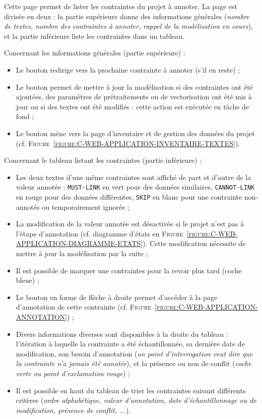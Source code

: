 		Cette page permet de lister les contraintes du projet à annoter.
		La page est divisée en deux : la partie supérieure donne des informations générales (\textit{nombre de textes, nombre des contraintes à annoter, rappel de la modélisation en cours}), et la partie inférieure liste les contraintes dans un tableau.
		
		Concernant les informations générales (partie supérieure) :
		\begin{itemize}
			\item Le bouton  redirige vers la prochaine contrainte à annoter (s'il en reste) ;
			\item Le bouton  permet de mettre à jour la modélisation si des contraintes ont été ajoutées, des paramètres de prétraitements ou de vectorisation ont été mis à jour ou si des textes ont été modifiés : cette action est exécutée en tâche de fond ;
			\item Le bouton  mène vers la page d'inventaire et de gestion des données du projet (cf. \textsc{Figure~\ref{figure:C-WEB-APPLICATION-INVENTAIRE-TEXTES}}).
		\end{itemize}
		
		Concernant le tableau listant les contraintes (partie inférieure) :
		\begin{itemize}
			\item Les deux textes d'une même contraintes sont affiché de part et d'autre de la valeur annotée : \texttt{MUST-LINK} en vert pour des données similaires, \texttt{CANNOT-LINK} en rouge pour des données différentes, \texttt{SKIP} en blanc pour une contrainte non-annotés ou temporairement ignorée ;
			\item La modification de la valeur annotée est désactivée si le projet n'est pas à l'étape d'annotation (cf. diagramme d'états en \textsc{Figure~\ref{figure:C-WEB-APPLICATION-DIAGRAMME-ETATS}}).
			Cette modification nécessite de mettre à jour la modélisation par la suite ;
			\item Il est possible de marquer une contraintes pour la revoir plus tard (coche bleue) ;
			\item Le bouton en forme de flèche à droite permet d'accéder à la page d'annotation de cette contrainte (cf. \textsc{Figure~\ref{figure:C-WEB-APPLICATION-ANNOTATION}}) ;
			\item Divers informations diverses sont disponibles à la droite du tableau : l'itération à laquelle la contrainte a été échantillonnée, sa dernière date de modification, son besoin d'annotation (\textit{un point d'interrogation veut dire que la contrainte n'a jamais été annotée}), et la présence ou non de conflit (\textit{coche verte ou point d'exclamation rouge}) ;
			\item Il est possible en haut du tableau de trier les contraintes suivant différents critères (\textit{ordre alphabétique, valeur d'annotation, date d'échantillonnage ou de modification, présence de conflit, ...}).
		\end{itemize}
	

